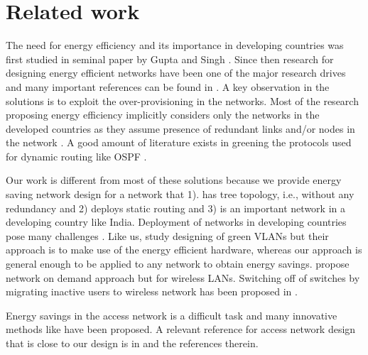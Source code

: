 \documentclass{article}
\begin{document}
 

\section{Related work} 
\label{sec:relatedwork}

The need for energy efficiency and its importance in developing countries was first studied in seminal paper by Gupta and Singh \cite{gupta2003greening}. Since then research for designing energy efficient networks have been one of the major research drives and many important references can be found in \cite{bolla2011}. A key observation in the solutions is to exploit the over-provisioning in the networks. Most of the research proposing energy efficiency implicitly considers only the networks in the developed countries as they assume presence of redundant links and/or nodes in the network \cite{mahadevan2010energy} \cite{mahadevan2009energy} \cite{chabarek2008power}. A good amount of literature exists in greening the protocols used for dynamic routing like OSPF \cite{cianfrani2012ospf} \cite{amaldi2011energy}\cite{bianzino2012grida}.

Our work is different from most of these solutions because we provide energy saving network design for a network that 1). has tree topology, i.e., without any redundancy and 2) deploys static routing and 3) is an important network in a developing country like India. Deployment of networks in developing countries pose many challenges \cite{nungu2011powering}. Like us, \cite{he2012greenvlan} study designing of green VLANs but their approach is to make use of the energy efficient hardware, whereas our approach is general enough to be applied to any network to obtain energy savings. \cite{jardosh2009green} propose network on demand approach but for wireless LANs. Switching off of switches by migrating inactive users to wireless network has been proposed in \cite{le2010performance}.

Energy savings in the access network is a difficult task and many innovative methods like \cite{NikosDSLAMSigcom}\cite{reich2010sleepless}\cite{allman2007enabling} have been proposed. A relevant reference for access network design that is close to our design is in \cite{andrews1998access}\cite{gollowitzer2011two}\cite{rodriguez2009improved}  and the references therein. 
 
\end{document}
